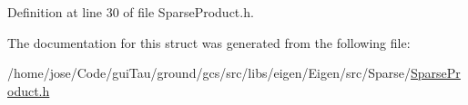 Definition at line 30 of file Sparse\-Product.\-h.



The documentation for this struct was generated from the following file\-:\begin{DoxyCompactItemize}
\item 
/home/jose/\-Code/gui\-Tau/ground/gcs/src/libs/eigen/\-Eigen/src/\-Sparse/\hyperlink{_sparse_product_8h}{Sparse\-Product.\-h}\end{DoxyCompactItemize}

